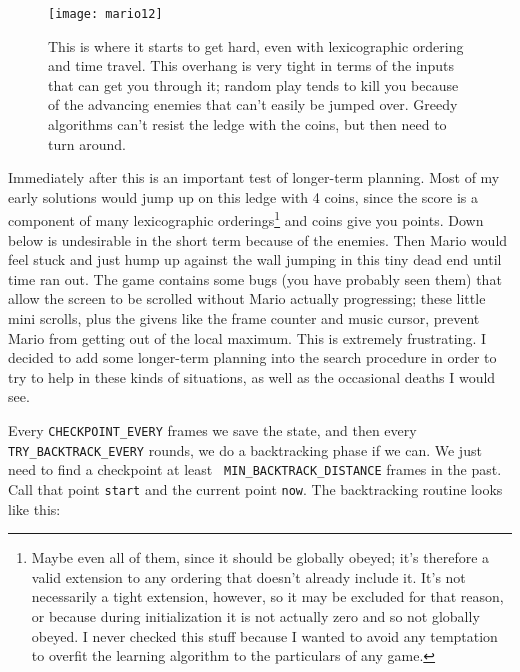 \documentclass[twocolumn]{article}
\begin{document}
\begin{figure}[h!tb]
\begin{center}
\texttt{[image: mario12]}
\end{center}\vspace{-0.1in}
\caption{This is where it starts to get hard, even with lexicographic
ordering and time travel. This overhang is very tight in terms of the
inputs that can get you through it; random play tends to kill you because
of the advancing enemies that can't easily be jumped over. Greedy
algorithms can't resist the ledge with the coins, but then need to
turn around.}
\label{fig:mario12}
\end{figure}

Immediately after this is an important test of longer-term planning.
Most of my early solutions would jump up on this ledge with 4 coins,
since the score is a component of many lexicographic
orderings\footnote{Maybe even all of them, since it should be globally
  obeyed; it's therefore a valid extension to any ordering that
  doesn't already include it. It's not necessarily a tight extension,
  however, so it may be excluded for that reason, or because during
  initialization it is not actually zero and so not globally obeyed. I
  never checked this stuff because I wanted to avoid any temptation to
  overfit the learning algorithm to the particulars of any game.} and
coins give you points. Down below is undesirable in the short term
because of the enemies. Then Mario would feel stuck and just hump up
against the wall jumping in this tiny dead end until time ran out. The
game contains some bugs (you have probably seen them) that allow the
screen to be scrolled without Mario actually progressing; these little
mini scrolls, plus the givens like the frame counter and music cursor,
prevent Mario from getting out of the local maximum. This is extremely
frustrating. I decided to add some longer-term planning into the
search procedure in order to try to help in these kinds of situations,
as well as the occasional deaths I would see.

Every {\tt CHECKPOINT\_EVERY} frames we save the state, and then every
{\tt TRY\_BACKTRACK\_EVERY} rounds, we do a backtracking phase if we
can. We just need to find a checkpoint at least {\tt
  MIN\_BACKTRACK\_DISTANCE} frames in the past. Call that point
{\tt start} and the current point {\tt now}. The backtracking
routine looks like this:
\end{document}
